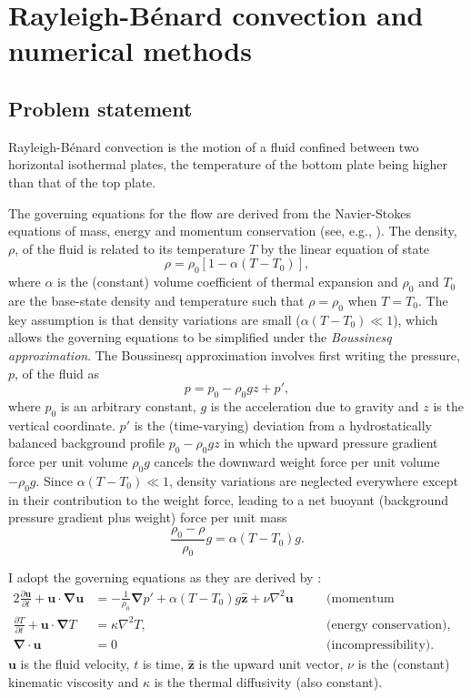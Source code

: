\documentclass[titlepage]{article}
\numberwithin{equation}{section}
\newcommand{\pdiff}[2]{\frac{\partial #1}{\partial #2}}
\renewcommand\vec{\bm}
\newcommand{\uvec}[1]{\vec{\hat{#1}}}
\newcommand{\grad}{\vec{\nabla}}
\newcommand{\rb}{Rayleigh-B\'{e}nard}
\begin{document}
\newpage
\section{\rb{} convection and numerical methods}
\subsection{Problem statement}
\rb{} convection is the motion of a fluid confined between two horizontal
isothermal plates, the temperature of the bottom plate being higher than that
of the top plate.

The governing equations for the flow are derived from the Navier-Stokes
equations of mass, energy and momentum conservation (see, e.g.,
\textcite{chandrasekhar1961}). The density, $\rho$, of the fluid is related to
its temperature $T$ by the linear equation of state
\[
    \rho = \rho_0 [1 - \alpha(T - T_0)],
\]
where $\alpha$ is the (constant) volume coefficient of thermal expansion and
$\rho_0$ and $T_0$ are the base-state density and temperature such that $\rho =
\rho_0$ when $T = T_0$. The key assumption is that density variations are small
($\alpha (T - T_0) \ll 1$), which allows the governing equations to be
simplified under the \emph{Boussinesq approximation}. The Boussinesq
approximation involves first writing the pressure, $p$, of the fluid as
\[
    p = p_0 - \rho_0 gz + p',
\]
where $p_0$ is an arbitrary constant, $g$ is the acceleration due to gravity
and $z$ is the vertical coordinate. $p'$ is the (time-varying) deviation from
a hydrostatically balanced background profile $p_0 - \rho_0 gz$
in which the upward pressure gradient force per unit volume $\rho_0 g$ cancels
the downward weight force per unit volume $-\rho_0 g$. Since
$\alpha (T - T_0) \ll 1$, density variations are neglected everywhere except
in their contribution to the weight force, leading to a net buoyant
(background pressure gradient plus weight) force per unit mass
\[
    \frac{\rho_0 - \rho}{\rho_0} g = \alpha (T - T_0) g.
\]

I adopt the governing equations as they are derived by
\textcite{chandrasekhar1961}:
\begin{alignat}{2}
    \label{eqn:dim_momentum}
    \pdiff{\vec{u}}{t} + \vec{u} \cdot \grad \vec{u}
        &= -\frac{1}{\rho_0} \grad p' + \alpha (T - T_0) g \uvec{z}
        + \nu \nabla^2 \vec{u}
    &\quad& \text{(momentum conservation),} \\
    \label{eqn:dim_energy}
    \pdiff{T}{t} + \vec{u} \cdot \grad T
        &= \kappa \nabla^2 T,
    && \text{(energy conservation), and} \\
    \label{eqn:dim_incompressible}
    \grad \cdot \vec{u} &= 0
    && \text{(incompressibility).}
\end{alignat}
$\vec{u}$ is the fluid velocity, $t$ is time, $\uvec{z}$ is the upward
unit vector, $\nu$ is the (constant) kinematic viscosity and $\kappa$ is the
thermal diffusivity (also constant).
\end{document}
